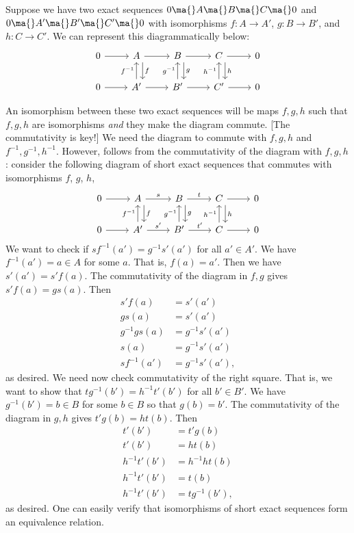 Suppose we have two exact sequences $0 \ma{} A \ma{} B \ma{} C \ma{} 0$ and $0 \ma{} A' \ma{} B' \ma{} C' \ma{} 0$ with isomorphisms $f: A \to A'$, $g: B \to B'$, and $h: C \to C'$. We can represent this diagrammatically below:
	\[
	\begin{tikzcd}
	0 \arrow{r} & A \arrow[shift left=1.5ex]{d}{f} \arrow{r} & B \arrow[shift left=1.5ex]{d}{g} \arrow{r} & C \arrow[shift left=1.5ex]{d}{h} \arrow{r} & 0 \\
	0 \arrow{r} & A' \arrow{u}{f^{-1}} \arrow{r} & B' \arrow{u}{g^{-1}} \arrow{r} & C' \arrow{u}{h^{-1}} \arrow{r} & 0
	\end{tikzcd}
	\]


An isomorphism between these two exact sequences will be maps $f,g,h$ such that $f,g,h$ are isomorphisms \emph{and} they make the diagram commute. [The commutativity is key!] We need the diagram to commute with $f,g,h$ and $f^{-1},g^{-1},h^{-1}$. However, follows from the commutativity of the diagram with $f,g,h$: consider the following diagram of short exact sequences that commutes with isomorphisms $f$, $g$, $h$,
	\[
	\begin{tikzcd}
	0 \arrow{r} & A \arrow[shift left=1.5ex]{d}{f} \arrow{r}{s} & B \arrow[shift left=1.5ex]{d}{g} \arrow{r}{t} & C \arrow[shift left=1.5ex]{d}{h} \arrow{r} & 0 \\
	0 \arrow{r} & A' \arrow{u}{f^{-1}} \arrow{r}{s'} & B' \arrow{u}{g^{-1}} \arrow{r}{t'} & C \arrow{u}{h^{-1}} \arrow{r} & 0
	\end{tikzcd}
	\] 
We want to check if $sf^{-1}(a')=g^{-1}s'(a')$ for all $a' \in A'$. We have $f^{-1}(a')=a \in A$ for some $a$. That is, $f(a)=a'$. Then we have $s'(a')=s'f(a)$. The commutativity of the diagram in $f,g$ gives $s'f(a)=gs(a)$. Then
	\[
	\begin{split}
	s'f(a) &=s'(a') \\ 
	gs(a) &=s'(a') \\
	g^{-1}gs(a) &=g^{-1}s'(a') \\
	s(a) &= g^{-1}s'(a') \\
	sf^{-1}(a') &= g^{-1}s'(a'),
	\end{split}
	\]
as desired. We need now check commutativity of the right square. That is, we want to show that $tg^{-1}(b')=h^{-1}t'(b')$ for all $b' \in B'$. We have $g^{-1}(b') = b \in B$ for some $b \in B$ so that $g(b)=b'$. The commutativity of the diagram in $g,h$ gives $t'g(b)=ht(b)$. Then
	\[
	\begin{split}
	t'(b') &= t'g(b) \\
	t'(b') &= ht(b) \\
	h^{-1}t'(b') &= h^{-1}ht(b) \\
	h^{-1}t'(b') &= t(b) \\
	h^{-1}t'(b') &= tg^{-1}(b'),
	\end{split}
	\]
as desired. One can easily verify that isomorphisms of short exact sequences form an equivalence relation.


